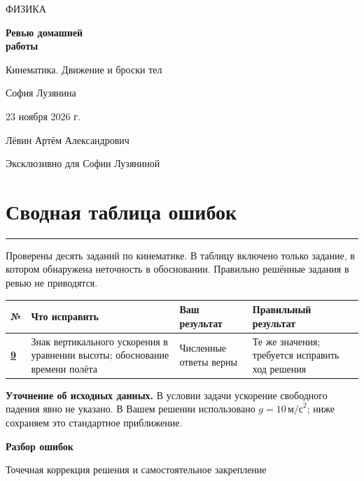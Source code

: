 \documentclass[a4paper,12pt]{article}
\newcommand{\sectionline}{\par\vspace{2mm}\noindent\color{accent}\rule{\linewidth}{0.65pt}\color{black}\par\vspace{1mm}}
\newcommand{\lbl}[1]{\textbf{\color{darkaccent}#1}}
\begin{document}
\thispagestyle{empty}
\vspace*{24mm}
{\color{accent}\large ФИЗИКА\par}
\vspace{19mm}
{\Huge\bfseries Ревью домашней\\[3mm] работы\par}
\vspace{8mm}
{\Large\color{darkaccent}Кинематика. Движение и броски тел\par}
\vspace{32mm}
{\Large София Лузянина\par}
\vspace{5mm}
{\large 23 ноября 2026 г.\par}
\vfill
{\normalsize Лёвин Артём Александрович\par}
{\small\color{muted}Эксклюзивно для Софии Лузяниной\par}
\vspace{15mm}
\newpage
\section*{Сводная таблица ошибок}
\sectionline
Проверены десять заданий по кинематике. В таблицу включено только задание, в котором обнаружена неточность в обосновании. Правильно решённые задания в ревью не приводятся.
\par\vspace{4mm}
{\small
\renewcommand{\arraystretch}{1.35}
\begin{tabularx}{\linewidth}{@{}p{13mm}X p{34mm}p{34mm}@{}}
\toprule
\textbf{№} & \textbf{Что исправить} & \textbf{Ваш результат} & \textbf{Правильный результат}\\
\midrule
\hyperref[task:9]{\textbf{9}} & Знак вертикального ускорения в уравнении высоты; обоснование времени полёта & Численные ответы верны & Те же значения; требуется исправить ход решения \\
\bottomrule
\end{tabularx}
}\par
\vspace{7mm}
\lbl{Уточнение об исходных данных.} В условии задачи ускорение свободного падения явно не указано. В Вашем решении использовано $g=10\,\text{м/с}^2$; ниже сохраняем это стандартное приближение.
\newpage
\thispagestyle{empty}
\null\vfill
\begin{center}
{\color{accent}\Large\bfseries Разбор ошибок}\par
\vspace{5mm}
{\color{muted}Точечная коррекция решения и самостоятельное закрепление}
\end{center}
\vfill\null
\newpage
{}\label{task:9}
\end{document}
